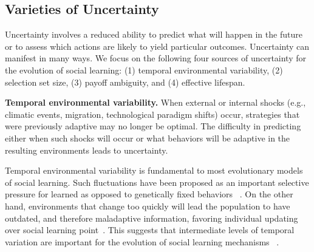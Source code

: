 \documentclass[letterpaper,11.5pt]{scrartcl}
\newcommand{\mt}[1]{{\textcolor{myorange} {({\tiny MT:} #1)}}}
\begin{document}

\subsection{Varieties of Uncertainty}

Uncertainty involves a reduced ability to predict what will happen in the future or to assess which actions are likely to yield particular outcomes. Uncertainty can manifest in many ways. We focus on the following four sources of uncertainty for the evolution of social learning: (1) temporal environmental variability, (2) selection set size, (3) payoff ambiguity, and (4) effective lifespan.

\textbf{Temporal environmental variability.}
When external or internal shocks (e.g., climatic events, migration, technological paradigm shifts) occur, strategies that were previously adaptive may no longer be optimal. The difficulty in predicting either when such shocks will occur or what behaviors will be adaptive in the resulting environments leads to uncertainty. 

Temporal environmental variability is fundamental to most evolutionary models of social learning. Such fluctuations have been proposed as an important selective pressure for learned as opposed to genetically fixed behaviors ~\cite{Richerson2000}. On the other hand, environments that change too quickly will lead the population to have outdated, and therefore maladaptive information, favoring individual updating over social learning point~\cite{Feldman1996, BoydRicherson1985}. This suggests that intermediate levels of temporal variation are important for the evolution of social learning mechanisms ~\cite{aoki2005}.
\end{document}
